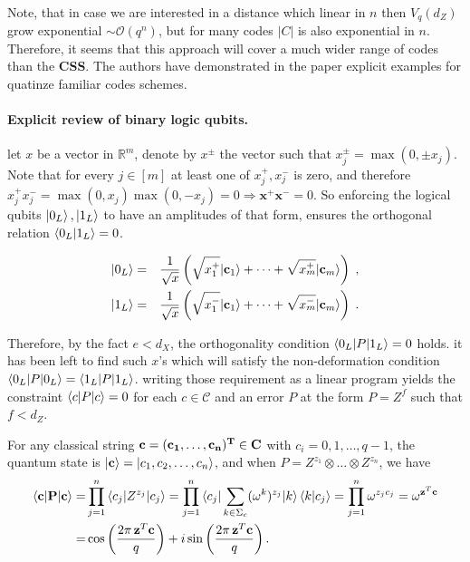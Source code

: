 \documentclass{article}
\begin{document}
\paragraph{}
Note, that in case we are interested in a distance which linear in \(n\) then  \(V_{q}(d_Z)\) grow exponential \( \sim \mathcal{O}(q^n) \), but for many codes \( |C| \) is also exponential in \( n\). Therefore, it seems that this approach will cover a much wider range of codes than the \textbf{CSS}. The authors have demonstrated in the paper explicit examples for quatinze familiar codes schemes.   
\paragraph{Explicit review of binary logic qubits.} let \(x\) be a vector in \(  \mathbb{R}^m\), denote by \(x^{\pm}\) the vector such that \(x^{\pm}_{j} = \max (0, \pm x_j )\). Note that for every \(j\in [m]\) at least one of \(x^{+}_j, x^{-}_j\) is zero, and therefore \( x^{+}_jx^{-}_j = \max (0, x_j )\max (0, - x_j ) = 0 \Rightarrow \mathbf{x^{+}}\mathbf{x^{-}} = 0 \). So enforcing the logical qubits \( \ket{0_L}, \ket{1_L} \) to have an amplitudes of that form, ensures the orthogonal relation \( \braket{0_L | 1_L } = 0\).

\begin{eqnarray}
|0_{L}\rangle & = & \frac{1}{\sqrt{x}}\left(\sqrt{x_{1}^{+}}|{\bf c}_{1}\rangle+\cdots+\sqrt{x_{m}^{+}}|{\bf c}_{m}\rangle\right)\;,\label{eq:Logical0}\\
|1_{L}\rangle & = & \frac{1}{\sqrt{x}}\left(\sqrt{x_{1}^{-}}|{\bf c}_{1}\rangle+\cdots+\sqrt{x_{m}^{-}}|{\bf c}_{m}\rangle\right)\;.\label{eq:Logical1}
\end{eqnarray}

Therefore, by the fact \(e < d_X \), the orthogonality condition \( \braket{0_L|P|1_L} = 0 \) holds.  it has been left to find such \(x\)'s which will satisfy the non-deformation condition \( \braket{0_L|P|0_L} = \braket{1_L|P|1_L} \). writing those requirement as a linear program yields the constraint \( \braket{c|P|c} = 0 \) for each \( c \in \mathcal{C} \) and an error \(P\) at the form \( P = Z^f  \) such that \( f < d_Z \).     



For any classical string \(\bf c =(c_{1},\dots,c_{n})^T\in{C}\) with \(c_i = 0,1,\dots,q-1\), the quantum state is \(|{\bf c} \rangle=|c_1,c_2,\dots,c_n\rangle\), and 
when \(P = Z^{z_1}\otimes \dots \otimes Z^{z_n}\), we have
\begin{align}
    \braket{\bf c|P|\bf c} 
    =& \prod_{j=1}^n \braket{c_j|Z^{z_j}|c_j} = \prod_{j=1}^n \braket{c_j|\sum_{k\in\Sigma_c} (\omega^k)^{z_j} |k}\braket{k|c_j}=\prod_{j=1}^n \omega^{z_j c_j} =\omega^{{\bf z}^{T}{\bf c}}
    \\
    =&\cos\left(\frac{2\pi\,{\bf z}^{T}{\bf c}}{q}\right)+i\sin\left(\frac{2\pi\,{\bf z}^{T}{\bf c}}{q}\right).\label{eq:cosine-sine}
\end{align} 
\end{document}
